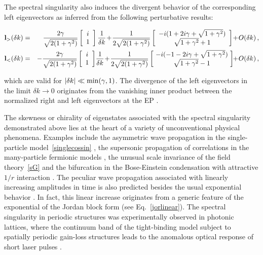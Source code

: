 \documentclass{tADP2e}
\theoremstyle{plain}
\newcommand{\eqn}[1]{
\begin{eqnarray}
	#1
\end{eqnarray}
}
\theoremstyle{plain}
\theoremstyle{definition}
\begin{document}
{ The spectral singularity also induces the divergent behavior of the corresponding left eigenvectors as inferred from the following perturbative results:
\eqn{
{\bf l}_{>}(\delta k)&=&\!\frac{2\gamma}{\sqrt{2(1+\gamma^2)}}\left[\begin{array}{c}
i\\
1
\end{array}\right]\frac{1}{\delta k}\!+\!\frac{1}{2\sqrt{2(1+\gamma^2)}}\left[\begin{array}{c}
-i(1+2i\gamma+\sqrt{1+\gamma^2})\\
\sqrt{1+\gamma^2}+1
\end{array}\right]\!+\!O\!\left(\delta k\right),\nonumber%
\\
{\bf l}_{<}(\delta k)&=&-\frac{2\gamma}{\sqrt{2(1+\gamma^2)}}\left[\begin{array}{c}
i\\
1
\end{array}\right]\!\frac{1}{\delta k}\!+\!\frac{1}{2\sqrt{2(1+\gamma^2)}}\left[\!\begin{array}{c}
-i(-1-2i\gamma+\sqrt{1+\gamma^2})\\
\sqrt{1+\gamma^2}-1
\end{array}\!\right]\!\!+\!O\!\left(\delta k\right),\nonumber%
}
which are valid for $|\delta k|\ll{\rm min}(\gamma,1)$. The divergence of the left eigenvectors in the limit $\delta k\to 0$ originates from the vanishing inner product between the normalized right and left eigenvectors at the EP \cite{HWD01}. 

The skewness or chirality of eigenstates associated with the spectral singularity demonstrated above lies at the heart of a variety of unconventional physical phenomena. Examples include the asymmetric wave propagation in the single-particle model~\eqref{singlecossin} \cite{LSS10}, the supersonic propagation of correlations in the many-particle fermionic models   \cite{YA18,DB19},  the unusual scale invariance of the field theory~\eqref{sG} \cite{SN1990,YA17nc,IY16} and the bifurcation in the Bose-Einstein condensation with attractive $1/r$ interaction \cite{CH08}. The peculiar wave propagation associated with linearly increasing amplitudes in time is also predicted besides the usual exponential behavior \cite{LSS10}. In fact, this linear increase originates from a generic feature of the exponential of the Jordan block form (see Eq.~\eqref{jorlinear}). The spectral singularity in periodic structures was experimentally observed in photonic lattices, where the continuum band of the tight-binding model subject to spatially periodic gain-loss structures leads to the anomalous optical response of short laser pulses \cite{RA12pt,ZB15}. 
}
\end{document}

